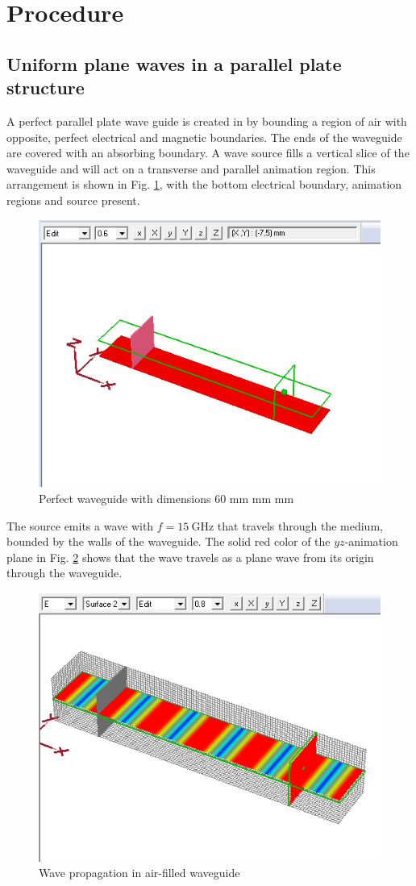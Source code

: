 \section{Procedure}\label{sec:procedure}
\subsection{Uniform plane waves in a parallel plate structure}\label{sec:upw}
A perfect parallel plate wave guide is created in \mefisto by bounding a region of air with opposite, perfect electrical and magnetic boundaries.
The ends of the waveguide are covered with an absorbing boundary.
A wave source fills a vertical slice of the waveguide and will act on a transverse and parallel animation region.
This arrangement is shown in Fig. \ref{fig:waveguide}, with the bottom electrical boundary, animation regions and source present.

\begin{figure}[tbph]
	\centering
	\includegraphics[width=0.7\linewidth]{graphics/waveguide}
	\caption{Perfect waveguide with dimensions 60 mm  mm  mm}
	\label{fig:waveguide}
\end{figure}

The source emits a wave with $f = \SI{15}{\giga\hertz}$ that travels through the medium, bounded by the walls of the waveguide.
The solid red color of the $yz$-animation plane in Fig. \ref{fig:Task1-2dsurface} shows that the wave travels as a plane wave from its origin through the waveguide.

\begin{figure}[tbph]
	\centering
	\includegraphics[width=0.7\linewidth]{graphics/Task1-2dsurface}
	\caption{Wave propagation in air-filled waveguide}
	\label{fig:Task1-2dsurface}
\end{figure}

